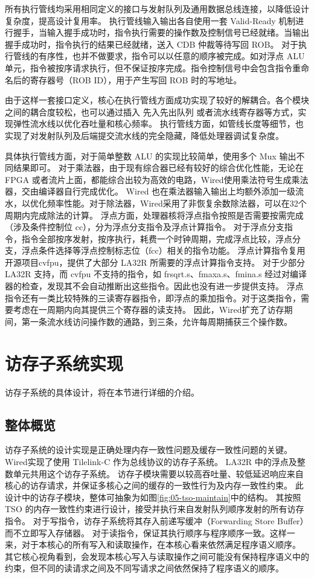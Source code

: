 所有执行管线均采用相同定义的接口与发射队列及通用数据总线连接，以降低设计复杂度，提高设计复用率。 执行管线输入输出各自使用一套 Valid-Ready 机制进行握手，当输入握手成功时，指令执行需要的操作数及控制信号已经就绪。当输出握手成功时，指令执行的结果已经就绪，送入 CDB 仲裁等待写回 ROB。 对于执行管线的有序性，也并不做要求，指令可以以任意的顺序被完成。如对浮点 ALU 单元，指令被按序请求执行，但不保证按序完成。指令控制信号中会包含指令重命名后的寄存器号（ROB ID），用于产生写回 ROB 时的写地址。

由于这样一套接口定义，核心在执行管线方面成功实现了较好的解耦合。各个模块之间的耦合度较松，也可以通过插入 先入先出队列 或者流水线寄存器等方式，实现弹性流水线以优化吞吐量和核心频率。 执行管线方面，如管线长度等细节，也实现了对发射队列及后端提交流水线的完全隐藏，降低处理器调试复杂度。

具体执行管线方面，对于简单整数 ALU 的实现比较简单，使用多个 Mux 输出不同结果即可。 对于乘法器，由于现有综合器已经有较好的综合优化性能，无论在 FPGA 或者流片上面，都能综合出较为高效的电路，Wired使用乘法符号生成乘法器，交由编译器自行完成优化。 Wired 也在乘法器输入输出上均额外添加一级流水，以优化频率性能。对于除法器，Wired采用了非恢复余数除法器，可以在32个周期内完成除法的计算。 浮点方面，处理器核将浮点指令按照是否需要按需完成（涉及条件控制位 cc），分为浮点分支指令及浮点计算指令。 对于浮点分支指令，指令全部按序发射，按序执行，耗费一个时钟周期，完成浮点比较，浮点分支，浮点条件选择等浮点控制标志位（fcc）相关的指令功能。 浮点计算指令复用开源项目cvfpu，提供了大部分 LA32R 所需要的浮点计算指令支持。 对于少部分 LA32R 支持，而 cvfpu 不支持的指令，如 frsqrt.s、fmaxa.s、fmina.s 经过对编译器的检查，发现其不会自动推断出这些指令。因此也没有进一步提供支持。 浮点指令还有一类比较特殊的三读寄存器指令，即浮点的乘加指令。对于这类指令，需要考虑在一周期内向其提供三个寄存器的读支持。 因此，Wired扩充了访存期间，第一条流水线访问操作数的通路，到三条，允许每周期捕获三个操作数。

\section{访存子系统实现}\label{sec:05-complex-cpu-013}

访存子系统的具体设计，将在本节进行详细的介绍。

\subsection{整体概览}\label{sec:05-complex-cpu-014}

访存子系统的设计实现是正确处理内存一致性问题及缓存一致性问题的关键。 Wired实现了使用 Tilelink-C 作为总线协议的访存子系统。 LA32R 中的浮点及整数单元共用这个访存子系统。 访存子模块需要以较高吞吐量、较低延迟响应来自核心的访存请求，并保证多核心之间的缓存的一致性行为及内存一致性约束。 此设计中的访存子模块，整体可抽象为如图\ref{fig:05-tso-maintain}中的结构。 其按照 TSO 的内存一致性约束进行设计，接受并执行来自发射队列顺序发射的所有访存指令。 对于写指令，访存子系统将其存入前递写缓冲（Forwarding Store Buffer）而不立即写入存储器。 对于读指令，保证其执行顺序与程序顺序一致。这样一来，对于本核心的所有写入和读取操作，在本核心看来依然满足程序语义顺序。 其它核心视角看到，会发现本核心写入与读取操作之间可能没有保持程序语义中的约束，但不同的读请求之间及不同写请求之间依然保持了程序语义的顺序。

